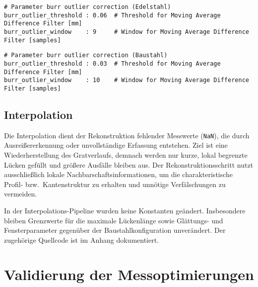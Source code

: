 \begin{lstlisting}[caption={Pipeline-Parameter Outlier Correction (Edelstahl, Burr-Kanal)}, label={lst:params-outlier-stainless}]
# Parameter burr outlier correction (Edelstahl)
burr_outlier_threshold : 0.06  # Threshold for Moving Average Difference Filter [mm]
burr_outlier_window    : 9     # Window for Moving Average Difference Filter [samples]
\end{lstlisting}

\begin{lstlisting}[caption={Pipeline-Parameter Outlier Correction (Baustahl, Burr-Kanal)}, label={lst:params-outlier-mild}]
# Parameter burr outlier correction (Baustahl)
burr_outlier_threshold : 0.03  # Threshold for Moving Average Difference Filter [mm]
burr_outlier_window    : 10    # Window for Moving Average Difference Filter [samples]
\end{lstlisting}

\subsection{Interpolation}
\label{sec:Interpolation}

Die Interpolation dient der Rekonstruktion fehlender Messwerte (\texttt{NaN}), die durch Ausreißererkennung oder unvollständige Erfassung entstehen. Ziel ist eine Wiederherstellung des Gratverlaufs, demnach werden nur kurze, lokal begrenzte Lücken gefüllt und größere Ausfälle bleiben aus. Der Rekonstruktionsschritt nutzt ausschließlich lokale Nachbarschaftsinformationen, um die charakteristische Profil- bzw.\ Kantenstruktur zu erhalten und unnötige Verfälschungen zu vermeiden.

In der Interpolations-Pipeline wurden keine Konstanten geändert. Insbesondere bleiben Grenzwerte für die maximale Lückenlänge sowie Glättungs- und Fensterparameter gegenüber der Baustahlkonfiguration unverändert. Der zugehörige Quellcode ist im Anhang dokumentiert.

\section {Validierung der Messoptimierungen}